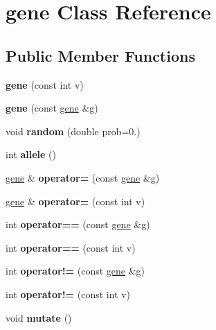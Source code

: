 \hypertarget{classgene}{\section{gene \-Class \-Reference}
\label{classgene}
}
\subsection*{\-Public \-Member \-Functions}
\begin{DoxyCompactItemize}
\item 
\hypertarget{classgene_adada0783df656bc9e3745fad731ca4c4}{{\bfseries gene} (const int v)}\label{classgene_adada0783df656bc9e3745fad731ca4c4}

\item 
\hypertarget{classgene_adfe0871adce828421c30c8536b7b3bd5}{{\bfseries gene} (const \hyperlink{classgene}{gene} \&g)}\label{classgene_adfe0871adce828421c30c8536b7b3bd5}

\item 
\hypertarget{classgene_a2a3871efae6f53d760c4d337092eb8e7}{void {\bfseries random} (double prob=0.)}\label{classgene_a2a3871efae6f53d760c4d337092eb8e7}

\item 
\hypertarget{classgene_aaced5593e82dc2b52a408e2d0ca13be6}{int {\bfseries allele} ()}\label{classgene_aaced5593e82dc2b52a408e2d0ca13be6}

\item 
\hypertarget{classgene_a377b324cded051ed5480490906ca5d94}{\hyperlink{classgene}{gene} \& {\bfseries operator=} (const \hyperlink{classgene}{gene} \&g)}\label{classgene_a377b324cded051ed5480490906ca5d94}

\item 
\hypertarget{classgene_a27a378e3d4621c74df8e64e3033d1272}{\hyperlink{classgene}{gene} \& {\bfseries operator=} (const int v)}\label{classgene_a27a378e3d4621c74df8e64e3033d1272}

\item 
\hypertarget{classgene_a81a628b309e5c037206dbcee220d9b32}{int {\bfseries operator==} (const \hyperlink{classgene}{gene} \&g)}\label{classgene_a81a628b309e5c037206dbcee220d9b32}

\item 
\hypertarget{classgene_a77534636ddcbf4a36d7ea14a60260d4a}{int {\bfseries operator==} (const int v)}\label{classgene_a77534636ddcbf4a36d7ea14a60260d4a}

\item 
\hypertarget{classgene_a36ef57c0a982db5f9199181c377e28c0}{int {\bfseries operator!=} (const \hyperlink{classgene}{gene} \&g)}\label{classgene_a36ef57c0a982db5f9199181c377e28c0}

\item 
\hypertarget{classgene_a5774bd32bf4195798e1db443bcbc69a9}{int {\bfseries operator!=} (const int v)}\label{classgene_a5774bd32bf4195798e1db443bcbc69a9}

\item 
\hypertarget{classgene_a4fef8ba364809663833ac8a1e6860ed4}{void {\bfseries mutate} ()}\label{classgene_a4fef8ba364809663833ac8a1e6860ed4}

\end{DoxyCompactItemize}
